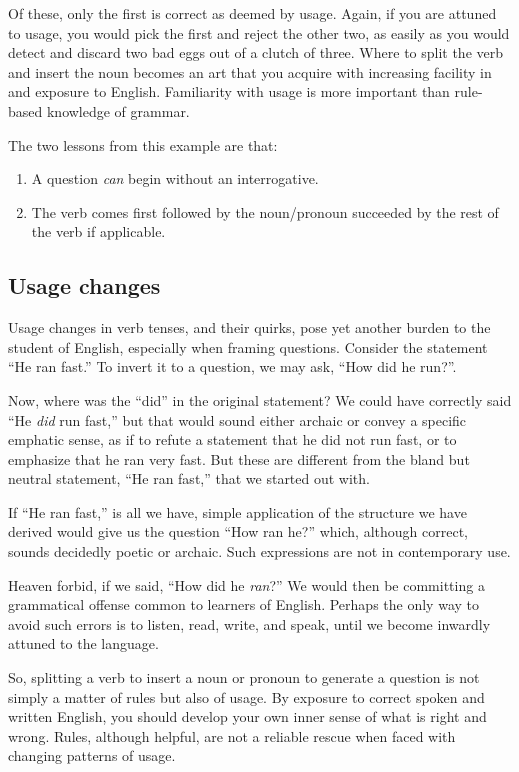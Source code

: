 \documentclass[
  11pt,
  british,
  a4paper,
]{article}
\begin{document}
Of these, only the first is correct as deemed by usage. Again, if you
are attuned to usage, you would pick the first and reject the other two,
as easily as you would detect and discard two bad eggs out of a clutch
of three. Where to split the verb and insert the noun becomes an art
that you acquire with increasing facility in and exposure to English.
Familiarity with usage is more important than rule-based knowledge of
grammar.

The two lessons from this example are that:

\begin{enumerate}
\item
  A question \emph{can} begin without an interrogative.
\item
  The verb comes first followed by the noun/pronoun succeeded by the
  rest of the verb if applicable.
\end{enumerate}

\hypertarget{usage-changes}{%
\subsection{Usage changes}\label{usage-changes}}

Usage changes in verb tenses, and their quirks, pose yet another burden
to the student of English, especially when framing questions. Consider
the statement ``He ran fast.'' To invert it to a question, we may ask,
``How did he run?''.

Now, where was the ``did'' in the original statement? We could have
correctly said ``He \emph{did} run fast,'' but that would sound either
archaic or convey a specific emphatic sense, as if to refute a statement
that he did not run fast, or to emphasize that he ran very fast. But
these are different from the bland but neutral statement, ``He ran
fast,'' that we started out with.

If ``He ran fast,'' is all we have, simple application of the structure
we have derived would give us the question ``How ran he?'' which,
although correct, sounds decidedly poetic or archaic. Such expressions
are not in contemporary use.

Heaven forbid, if we said, ``How did he \emph{ran}?'' We would then be
committing a grammatical offense common to learners of English. Perhaps
the only way to avoid such errors is to listen, read, write, and speak,
until we become inwardly attuned to the language.

So, splitting a verb to insert a noun or pronoun to generate a question
is not simply a matter of rules but also of usage. By exposure to
correct spoken and written English, you should develop your own inner
sense of what is right and wrong. Rules, although helpful, are not a
reliable rescue when faced with changing patterns of usage.
\end{document}
